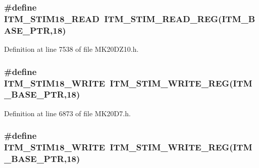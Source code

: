 \subsubsection[{\texorpdfstring{I\+T\+M\+\_\+\+S\+T\+I\+M18\+\_\+\+R\+E\+AD}{ITM_STIM18_READ}}]{\setlength{\rightskip}{0pt plus 5cm}\#define I\+T\+M\+\_\+\+S\+T\+I\+M18\+\_\+\+R\+E\+AD~{\bf I\+T\+M\+\_\+\+S\+T\+I\+M\+\_\+\+R\+E\+A\+D\+\_\+\+R\+EG}({\bf I\+T\+M\+\_\+\+B\+A\+S\+E\+\_\+\+P\+TR},18)}\hypertarget{group___i_t_m___register___accessor___macros_ga4d40ae88921303412c9628a350572a8a}{}\label{group___i_t_m___register___accessor___macros_ga4d40ae88921303412c9628a350572a8a}


Definition at line 7538 of file M\+K20\+D\+Z10.\+h.

\subsubsection[{\texorpdfstring{I\+T\+M\+\_\+\+S\+T\+I\+M18\+\_\+\+W\+R\+I\+TE}{ITM_STIM18_WRITE}}]{\setlength{\rightskip}{0pt plus 5cm}\#define I\+T\+M\+\_\+\+S\+T\+I\+M18\+\_\+\+W\+R\+I\+TE~{\bf I\+T\+M\+\_\+\+S\+T\+I\+M\+\_\+\+W\+R\+I\+T\+E\+\_\+\+R\+EG}({\bf I\+T\+M\+\_\+\+B\+A\+S\+E\+\_\+\+P\+TR},18)}\hypertarget{group___i_t_m___register___accessor___macros_ga1fb39bc1a36c6aed07b8588d2d1c77b0}{}\label{group___i_t_m___register___accessor___macros_ga1fb39bc1a36c6aed07b8588d2d1c77b0}


Definition at line 6873 of file M\+K20\+D7.\+h.

\subsubsection[{\texorpdfstring{I\+T\+M\+\_\+\+S\+T\+I\+M18\+\_\+\+W\+R\+I\+TE}{ITM_STIM18_WRITE}}]{\setlength{\rightskip}{0pt plus 5cm}\#define I\+T\+M\+\_\+\+S\+T\+I\+M18\+\_\+\+W\+R\+I\+TE~{\bf I\+T\+M\+\_\+\+S\+T\+I\+M\+\_\+\+W\+R\+I\+T\+E\+\_\+\+R\+EG}({\bf I\+T\+M\+\_\+\+B\+A\+S\+E\+\_\+\+P\+TR},18)}\hypertarget{group___i_t_m___register___accessor___macros_ga1fb39bc1a36c6aed07b8588d2d1c77b0}{}\label{group___i_t_m___register___accessor___macros_ga1fb39bc1a36c6aed07b8588d2d1c77b0}


